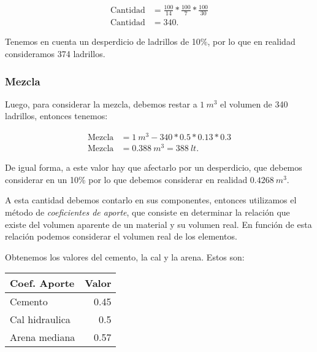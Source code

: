 \documentclass[../main.tex]{subfiles}
\begin{document}
  \begin{align*}
    \text{Cantidad} &= \frac{100}{14} * \frac{100}{7} * \frac{100}{30} \\[5pt]
    \text{Cantidad} &= 340
 .\end{align*}

Tenemos en cuenta un desperdicio de ladrillos de 10\%, por lo que en realidad
consideramos 374 ladrillos.

\subsubsection{Mezcla}

Luego, para considerar la mezcla, debemos restar a $\SI{1}{m^3}$ el volumen de
340 ladrillos, entonces tenemos:

\begin{align*}
  \text{Mezcla} &= \SI{1}{m^3} - 340*0.5*0.13*0.3 \\[5pt]
  \text{Mezcla} &= \SI{0.388}{m^3} = \SI{388}{lt}
.\end{align*}

De igual forma, a este valor hay que afectarlo por un desperdicio, que debemos
considerar en un 10\% por lo que debemos considerar en realidad $\SI{0.4268}{m^3}$.

A esta cantidad debemos contarlo en sus componentes, entonces utilizamos el método
de \textit{coeficientes de aporte}, que consiste en determinar la relación que
existe del volumen aparente de un material y su volumen real. En función de esta
relación podemos considerar el volumen real de los elementos.

Obtenemos los valores del cemento, la cal y la arena. Estos son:

\begin{table}[htbp]
  \centering
    \begin{tabular}{lr}
    \hline
    \multicolumn{1}{|l|}{Coef. Aporte} & \multicolumn{1}{l|}{Valor} \bigstrut\\
    \hline
    Cemento & 0.45 \bigstrut[t]\\
    Cal hidraulica & 0.5 \\
    Arena mediana & 0.57 \\
    \end{tabular}%
\end{table}%
\end{document}
